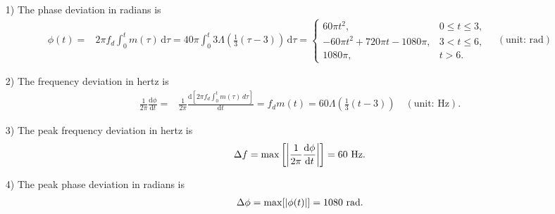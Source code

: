 \documentclass{assignment}
\begin{document}
\begin{sol}
    \begin{itemize}
        \item[1)] The phase deviation in radians is
        \begin{align}
            \phi(t)=&2\pi f_d\int_0^tm(\tau)\,\mathrm{d}\tau=40\pi\int_0^t3\Lambda\left(\frac{1}{3}(\tau-3)\right)\,\mathrm{d}\tau=\left\{\begin{array}{ll}
                60\pi t^2,&0\leq t\leq 3,\\
                -60\pi t^2+720\pi t-1080\pi,&3<t\leq 6,\\
                1080\pi,&t>6.
            \end{array}\right.\quad(\text{unit: rad})
        \end{align}
        \item[2)] The frequency deviation in hertz is
        \begin{align}
            \frac{1}{2\pi}\frac{\mathrm{d}\phi}{\mathrm{d}t}=&\frac{1}{2\pi}\frac{\mathrm{d}\left[2\pi f_d\int_0^tm(\tau)\,d\tau\right]}{\mathrm{d}t}=f_dm(t)=60\Lambda\left(\frac{1}{3}(t-3)\right)\quad(\text{unit: Hz}).
        \end{align}
        \item[3)] The peak frequency deviation in hertz is
        \begin{align}
            \Delta f=\max\left[\left\lvert\frac{1}{2\pi}\frac{\mathrm{d}\phi}{\mathrm{d}t}\right\rvert\right]=60\text{ Hz}.
        \end{align}
        \item[4)] The peak phase deviation in radians is
        \begin{align}
            \Delta\phi=\max[\left\lvert\phi(t)\right\rvert]=1080\text{ rad}.
        \end{align}
    \end{itemize}
\end{sol}
\end{document}
